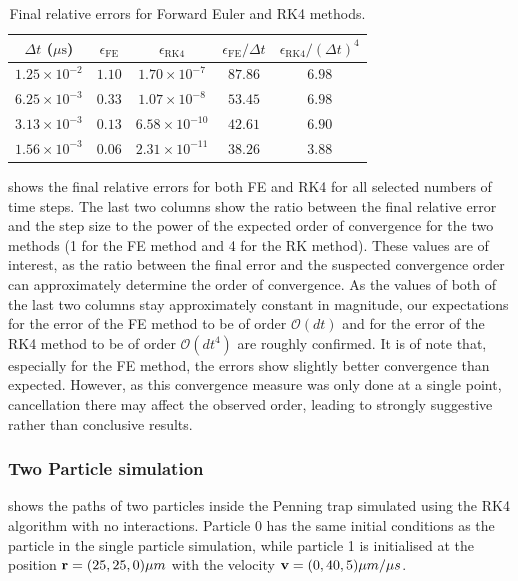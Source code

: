 \begin{table}[ht]
    \centering
    \caption{Final relative errors for Forward Euler and RK4 methods.}
    \label{tab:error-comparison}
    \begin{tabular}{ccccc}
        \hline
        $\Delta t$ ($\mu\mathrm{s}$) &
        $\epsilon_{\mathrm{FE}}$ &
        $\epsilon_{\mathrm{RK4}}$ &
        $\epsilon_{\mathrm{FE}} / \Delta t$ &
        $\epsilon_{\mathrm{RK4}} / (\Delta t)^4$ \\
        \hline
        $1.25 \times 10^{-2}$ & $1.10$ & $1.70 \times 10^{-7}$ & $87.86$ & $6.98$ \\
        $6.25 \times 10^{-3}$ & $0.33$ & $1.07 \times 10^{-8}$ & $53.45$ & $6.98$ \\
        $3.13 \times 10^{-3}$ & $0.13$ & $6.58 \times 10^{-10}$ & $42.61$ & $6.90$ \\
        $1.56 \times 10^{-3}$ & $0.06$ & $2.31 \times 10^{-11}$ & $38.26$ & $3.88$ \\
        \hline
    \end{tabular}
\end{table}
 shows the final relative errors for both FE and RK4 for all selected numbers of time steps.
The last two columns show the ratio between the final relative error and the step size to the power of the expected order of convergence for the two methods (1 for the FE method and 4 for the RK method).
These values are of interest, as the ratio between the final error and the suspected convergence order can approximately determine the order of convergence.
As the values of both of the last two columns stay approximately constant in magnitude, our expectations for the error of the FE method to be of order $\mathcal{O}(dt)$ and for the error of the RK4 method to be of order $\mathcal{O}(dt^4)$ are roughly confirmed.
It is of note that, especially for the FE method, the errors show slightly better convergence than expected.
However, as this convergence measure was only done at a single point, cancellation there may affect the observed order, leading to strongly suggestive rather than conclusive results.

\subsubsection*{Two Particle simulation}\label{sec:OnePart}

 shows the paths of two particles inside the Penning trap simulated using the RK4 algorithm with no interactions.
Particle 0 has the same initial conditions as the particle in the single particle simulation, while particle 1 is initialised at the position $\bold{r}=(25, 25, 0) \mu m$ with the velocity $\bold{v} = (0, 40, 5)\mu m/\mu s$.

